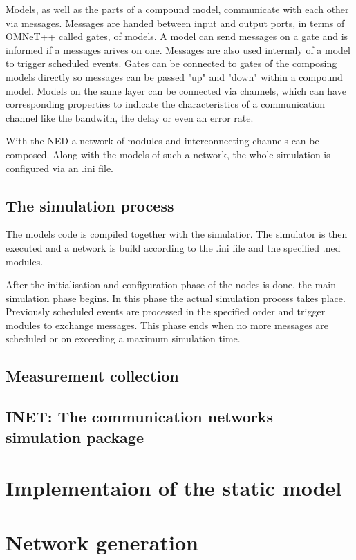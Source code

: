 Models, as well as the parts of a compound model, communicate with each other via messages. Messages are handed between input and output ports, in terms of OMNeT++ called gates, of models. A model can send messages on a gate and is informed if a messages arives on one. Messages are also used internaly of a model to trigger scheduled events. Gates can be connected to gates of the composing models directly so messages can be passed "up" and "down" within a compound model. Models on the same layer can be connected via channels, which can have corresponding properties to indicate the characteristics of a communication channel like the bandwith, the delay or even an error rate.

With the NED a network of modules and interconnecting channels can be composed. Along with the models of such a network, the whole simulation is configured via an .ini file.

\subsection{The simulation process}

The models code is compiled together with the simulatior. The simulator is then executed and a network is build according to the .ini file and the specified .ned modules.

After the initialisation and configuration phase of the nodes is done, the main simulation phase begins. In this phase the actual simulation process takes place. Previously scheduled events are processed in the specified order and trigger modules to exchange messages. This phase ends when no more messages are scheduled or on exceeding a maximum simulation time.

\subsection{Measurement collection}

\subsection{INET: The communication networks simulation package}


\section{Implementaion of the static model}


\section{Network generation}

